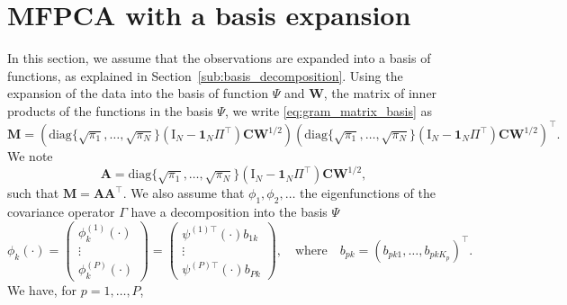

\section{MFPCA with a basis expansion} %
\label{sub:with_a_basis_expansion}

In this section, we assume that the observations are expanded into a basis of functions, as explained in Section~\ref{sub:basis_decomposition}. Using the expansion of the data into the basis of function $\Psi$ and $\mathbf{W}$, the matrix of inner products of the functions in the basis $\Psi$, we write \eqref{eq:gram_matrix_basis} as
\begin{equation}
    \mathbf{M} = \left(\text{diag}\{
        \sqrt{\pi_1}, \dots, \sqrt{\pi_N}\}\left(\mathrm{I}_{\!N} - \mathbf{1}_{\!N}\Pi^\top\right) \mathbf{C}\mathbf{W}^{1/2}\right)\left(\text{diag}\{
        \sqrt{\pi_1}, \dots, \sqrt{\pi_N}\}\left(\mathrm{I}_{\!N} - \mathbf{1}_{\!N}\Pi^\top\right) \mathbf{C}\mathbf{W}^{1/2}\right)^\top.
\end{equation}
We note
\begin{equation}
    \mathbf{A} = \text{diag}\{\sqrt{\pi_1}, \dots, \sqrt{\pi_N}\}\left(\mathrm{I}_{\!N} - \mathbf{1}_{\!N}\Pi^\top\right) \mathbf{C}\mathbf{W}^{1/2},
\end{equation}
such that $\mathbf{M} = \mathbf{A}\mathbf{A}^\top$.
We also assume that $\phi_1, \phi_2, \dots$ the eigenfunctions of the covariance operator $\Gamma$ have a decomposition into the basis $\Psi$
\begin{equation}
    \phi_k(\cdot) = 
        \begin{pmatrix} 
            \phi_k^{(1)}(\cdot) \\
            \vdots \\
            \phi_k^{(P)}(\cdot)
        \end{pmatrix} = 
        \begin{pmatrix} 
            \psi^{(1) \top}(\cdot) b_{1k} \\
            \vdots \\
            \psi^{(P) \top}(\cdot) b_{Pk}
        \end{pmatrix}, \quad\text{where}\quad
        b_{pk} = \left(b_{p k 1}, \dots, b_{p k K_p} \right)^\top.
\end{equation}
We have, for $p = 1, \dots, P$,
